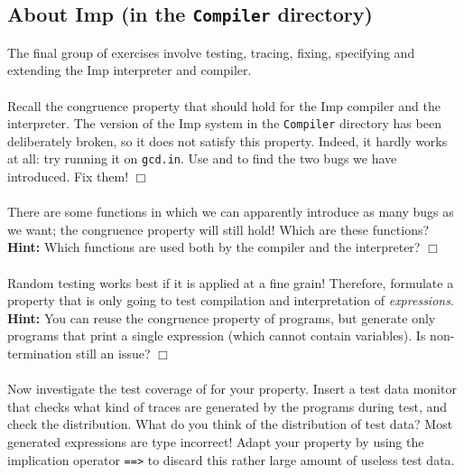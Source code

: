 \subsection{
\label{compilerprac}
About Imp (in the {\tt Compiler} directory)}

The final group of exercises involve testing, tracing, fixing, specifying
and extending the Imp interpreter and compiler.

\paragraph{\nextex}
Recall the \QuickCheck{} congruence property
that should hold for the Imp compiler and the interpreter.
The version of the Imp system in the {\tt Compiler} directory
has been deliberately broken, so it does not satisfy this
property.  Indeed, it hardly works at all: try running it
on {\tt gcd.in}.
Use \QuickCheck{} and \Hat{} to find the two bugs we have introduced.
Fix them!
\hfill$\Box$

\paragraph{\nextex}
There are some functions in which we can apparently introduce as
many bugs as we want; the congruence property will still hold!
Which are these functions?
{\bf Hint:} Which functions are used both by the compiler and the
interpreter?
\hfill$\Box$

\paragraph{\nextex}
Random testing works best if it is applied at a fine grain! Therefore,
formulate a property that is only going to test
compilation and interpretation of
{\em expressions}.
{\bf Hint:} You can reuse the congruence property of programs, but generate
only programs that print a single expression (which cannot contain variables).
Is non-termination still an issue?
\hfill$\Box$

\paragraph{\nextex}
Now investigate the test coverage of \QuickCheck{} for
your property. Insert a test data monitor that checks what kind of traces are
generated by the programs during test, and check the distribution.
What do you think of the distribution of
test data? Most generated expressions are type
incorrect! Adapt your property by using the implication operator {\tt ==>} to
discard this rather large amount of useless test data.

